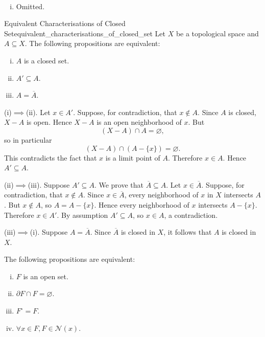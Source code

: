 \documentclass{report}
\begin{document}
\begin{prf}~\\ \vspace{-1em}
	\begin{enumerate}[(i)]
		\item Omitted.
	\end{enumerate}
\end{prf}


\begin{proposition}{Equivalent Characterisations of Closed Set}{equivalent_characterisations_of_closed_set}
	Let $X$ be a topological space and $A\subseteq X$. The following propositions are equivalent:
	\begin{enumerate}[(i)]
		\item $A$ is a closed set.
		\item $A'\subseteq A$.
		\item $A=\overline{A}$.
	\end{enumerate}
\end{proposition}
\begin{prf}
	(i)\(\implies\)(ii). Let \(x\in A'\). Suppose, for contradiction, that \(x\notin A\). Since \(A\) is closed, \(X-A\) is open. Hence \(X-A\) is an open neighborhood of \(x\). But
	\[
		(X-A)\cap A=\varnothing,
	\]
	so in particular
	\[
		(X-A)\cap (A-\{x\})=\varnothing.
	\]
	This contradicts the fact that $x$ is a limit point of $A$. Therefore \(x\in A\). Hence $A'\subseteq A$.
	
	(ii)\(\implies\)(iii). Suppose \(A'\subseteq A\). We prove that $\overline A\subseteq A$. Let \(x\in \overline A\). Suppose, for contradiction, that \(x\notin A\). Since \(x\in\overline A\), every neighborhood of \(x\) in \(X\) intersects \(A\). But \(x\notin A\), so $A=A-\{x\}$. Hence every neighborhood of \(x\) intersects \(A-\{x\}\). Therefore \(x\in A'\). By assumption \(A'\subseteq A\), so \(x\in A\), a contradiction. 

	(iii)\(\implies\)(i). Suppose \(A=\overline A\). Since \(\overline A\) is closed in \(X\), it follows that \(A\) is closed in \(X\).
\end{prf}


\begin{proposition}{}{}
	The following propositions are equivalent:
	\begin{enumerate}[(i)]
		\item $F$ is an open set.
		\item $\partial F\cap F=\varnothing$.
		\item $F^\circ=F$.
		\item $\forall x\in F,F\in \mathcal{N}(x)$.
	\end{enumerate}
\end{proposition}
\end{document}
